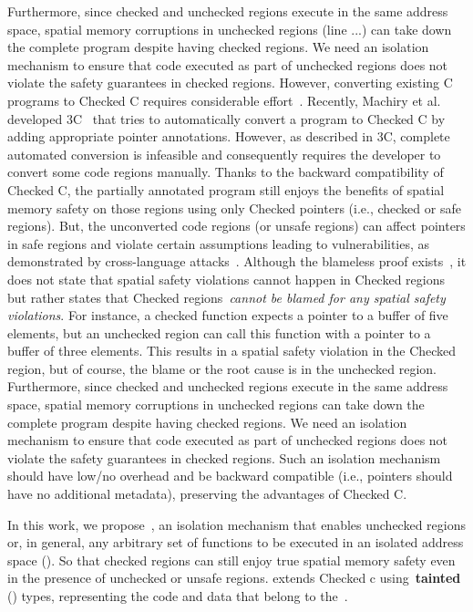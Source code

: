 Furthermore, since checked and unchecked regions execute in the same address space, spatial memory corruptions in unchecked regions (line ...) can take down the complete program despite having checked regions.
We need an isolation mechanism to ensure that code executed as part of unchecked regions does not violate the safety guarantees in checked regions.
However, converting existing C programs to Checked C requires considerable effort~\cite{duanrefactoring}. 
Recently, Machiry et al. developed 3C~\cite{machiry2022c} that tries to automatically convert a program to Checked C by adding appropriate pointer annotations.
However, as described in 3C, complete automated conversion is infeasible and consequently requires the developer to convert some code regions manually.
Thanks to the backward compatibility of Checked C, the partially annotated program still enjoys the benefits of spatial memory safety on those regions using only Checked pointers (i.e., checked or safe regions).
But, the unconverted code regions (or unsafe regions) can affect pointers in safe regions and violate certain assumptions leading to vulnerabilities, as demonstrated by cross-language attacks~\cite{mergendahlcross}.
%
Although the blameless proof exists~\cite{ruef2019achieving}, it does not state that spatial safety violations cannot happen in Checked regions but rather states that Checked regions~\emph{cannot be blamed for any spatial safety violations}.
For instance, a checked function expects a pointer to a buffer of five elements, but an unchecked region can call this function with a pointer to a buffer of three elements. This results in a spatial safety violation in the Checked region, but of course, the blame or the root cause is in the unchecked region.
Furthermore, since checked and unchecked regions execute in the same address space, spatial memory corruptions in unchecked regions can take down the complete program despite having checked regions.
We need an isolation mechanism to ensure that code executed as part of unchecked regions does not violate the safety guarantees in checked regions.
Such an isolation mechanism should have low/no overhead and be backward compatible (i.e., pointers should have no additional metadata), preserving the advantages of Checked C.

In this work, we propose~\systemname, an isolation mechanism that enables unchecked regions or, in general, any arbitrary set of functions to be executed in an isolated address space (\ucregion).
So that checked regions can still enjoy true spatial memory safety even in the presence of unchecked or unsafe regions.
\systemname extends Checked c using~\textbf{tainted} (\taintt) types, representing the code and data that belong to the~\ucregion.

